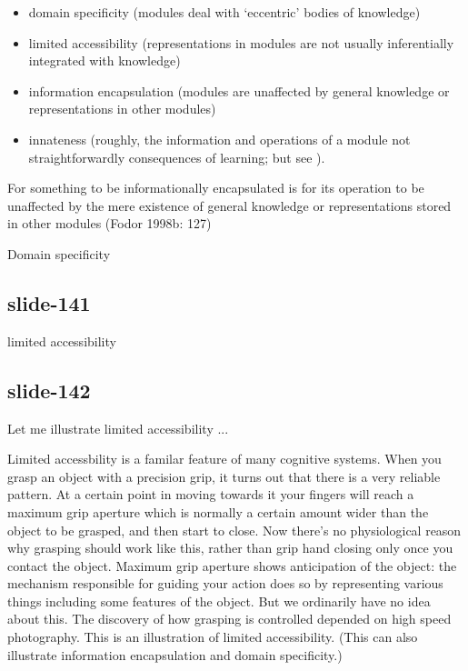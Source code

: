 \documentclass[12pt,\papersize]{extarticle}
\begin{document}
\begin{itemize}

\item domain specificity (modules deal with ‘eccentric’ bodies of knowledge)

\item limited accessibility (representations in modules are not usually inferentially integrated with knowledge)

\item information encapsulation (modules are unaffected by general knowledge or representations in other modules)

\item innateness (roughly, the information and operations of a module not straightforwardly consequences of learning; but see \citet{Samuels:2004ho}).

\end{itemize}

For something to be informationally encapsulated is for its operation to be unaffected by the mere existence of general knowledge or representations stored in other modules (Fodor 1998b: 127)

Domain specificity

\subsection{slide-141}
limited accessibility

\subsection{slide-142}
Let me illustrate limited accessibility ...

Limited accessbility is a familar feature of many cognitive systems.
When you grasp an object with a precision grip, it turns out that there is a very
reliable pattern.
At a certain point in moving towards it your fingers will reach a maximum grip aperture
which is normally a certain amount wider than the object to be grasped, and then start to close.
Now there's no physiological reason why grasping should work like this, rather than grip hand
closing only once you contact the object.
Maximum grip aperture shows anticipation of the object: the mechanism responsible for
guiding your action does so by representing various things including some features of
the object.
But we ordinarily have no idea about this.
The discovery of how grasping is controlled depended on high speed photography.
This is an illustration of limited accessibility.
(This can also illustrate information encapsulation and domain specificity.)
\end{document}
